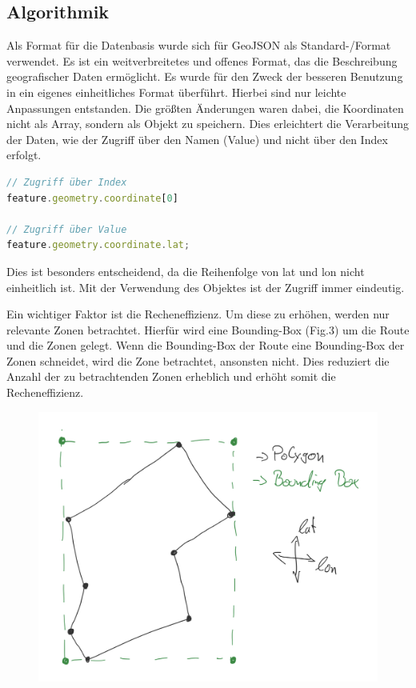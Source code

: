 \subsection*{Algorithmik}

Als Format für die Datenbasis wurde sich für GeoJSON als Standard-/Format \cite{butlerGeoJSONFormat2016} verwendet. Es ist ein weitverbreitetes und offenes Format, das die Beschreibung geografischer Daten ermöglicht. Es wurde für den Zweck der besseren Benutzung in ein eigenes einheitliches Format überführt. Hierbei sind nur leichte Anpassungen entstanden. Die größten Änderungen waren dabei, die Koordinaten nicht als Array, sondern als Objekt zu speichern. Dies erleichtert die Verarbeitung der Daten, wie der Zugriff über den Namen (Value) und nicht über den Index erfolgt.

\begin{lstlisting}[caption={Zugriff über Index oder Value},label={lst:replaceCode}, language=javascript]
// Zugriff über Index
feature.geometry.coordinate[0]

// Zugriff über Value
feature.geometry.coordinate.lat;
\end{lstlisting}


Dies ist besonders entscheidend, da die Reihenfolge von lat und lon nicht einheitlich ist. Mit der Verwendung des Objektes ist der Zugriff immer eindeutig.

Ein wichtiger Faktor ist die Recheneffizienz. Um diese zu erhöhen, werden nur relevante Zonen betrachtet. Hierfür wird eine Bounding-Box (Fig.3) um die Route und die Zonen gelegt. Wenn die Bounding-Box der Route eine Bounding-Box der Zonen schneidet, wird die Zone betrachtet, ansonsten nicht. Dies reduziert die Anzahl der zu betrachtenden Zonen erheblich und erhöht somit die Recheneffizienz.

\begin{figure}[!h]
    \begin{center}
        \includegraphics[scale=0.12]{images/boundingbox}
    \end{center}
\end{figure}

